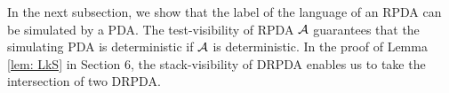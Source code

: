 In the next subsection,
we show that the label of the language of an RPDA can be
simulated by a PDA.
The test-visibility of RPDA ${\cal A}$ guarantees that
the simulating PDA is deterministic if ${\cal A}$ is deterministic.
In the proof of Lemma \ref{lem: LkS} in Section 6,
the stack-visibility of DRPDA enables us to take the intersection of two DRPDA.
